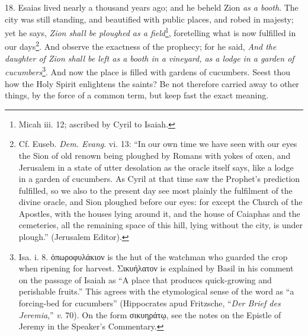 18. Esaias lived nearly a thousand years ago; and he beheld Zion \emph{as a booth}. The city was still standing, and beautified with public places, and robed in majesty; yet he says, \emph{Zion shall be ploughed as a field}\footnote{Micah iii. 12; ascribed by Cyril to Isaiah.}, foretelling what is now fulfilled in our days\footnote{Cf. Euseb. \emph{Dem. Evang}. vi. 13: “In our own time we have seen with our eyes the Sion of old renown being ploughed by Romans with yokes of oxen, and Jerusalem in a state of utter desolation as the oracle itself says, like a lodge in a garden of cucumbers. As Cyril at that time saw the Prophet’s prediction fulfilled, so we also to the present day see most plainly the fulfilment of the divine oracle, and Sion ploughed before our eyes: for except the Church of the Apostles, with the houses lying around it, and the house of Caiaphas and the cemeteries, all the remaining space of this hill, lying without the city, is under plough.” (Jerusalem Editor).}. And observe the exactness of the prophecy; for he said, \emph{And the daughter of Zion shall be left as a booth in a vineyard, as a lodge in a garden of cucumbers}\footnote{Isa. i. 8. \textgreek{ὀπωροφυλάκιον} is the hut of the watchman who guarded the crop when ripening for harvest. \textgreek{Σικυήλατον} is explained by Basil in his comment on the passage of Isaiah as “A place that produces quick-growing and perishable fruits.” This agrees with the etymological sense of the word as “a forcing-bed for cucumbers” (Hippocrates apud Fritzsche, “\emph{Der Brief des Jeremia},” \emph{v}. 70). On the form \textgreek{σικυηράτῳ}, see the notes on the Epistle of Jeremy in the Speaker’s Commentary.}. And now the place is filled with gardens of cucumbers. Seest thou how the Holy Spirit enlightens the saints? Be not therefore carried away to other things, by the force of a common term, but keep fast the exact meaning.


